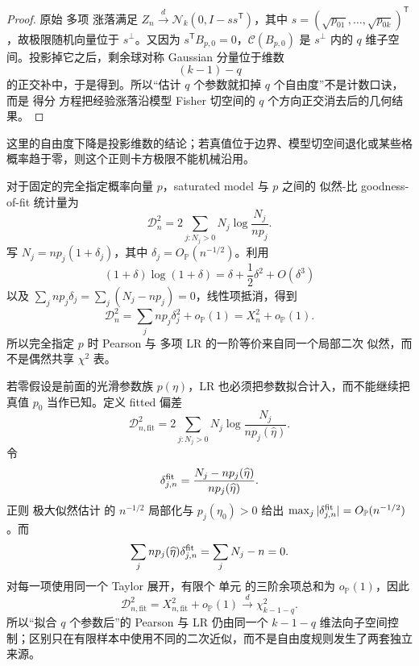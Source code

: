 \begin{proof}
原始 多项 涨落满足 $Z_n\xrightarrow{d}\mathcal N_k(0,I-ss^{\mathsf T})$，其中 $s=(\sqrt{p_{01}},\ldots,\sqrt{p_{0k}})^{\mathsf T}$，故极限随机向量位于 $s^\perp$。又因为 $s^{\mathsf T}B_{p,0}=0$，$\mathcal C(B_{p,0})$ 是 $s^\perp$ 内的 $q$ 维子空间。投影掉它之后，剩余球对称 Gaussian 分量位于维数
\[
 (k-1)-q
\]
的正交补中，于是得到。所以“估计 $q$ 个参数就扣掉 $q$ 个自由度”不是计数口诀，而是 得分 方程把经验涨落沿模型 Fisher 切空间的 $q$ 个方向正交消去后的几何结果。
\end{proof}

这里的自由度下降是投影维数的结论；若真值位于边界、模型切空间退化或某些格概率趋于零，则这个正则卡方极限不能机械沿用。

\begin{proposition}
对于固定的完全指定概率向量 $p$，saturated model 与 $p$ 之间的 似然-比 goodness-of-fit 统计量为
\[
 \mathcal D_n^{2}
 =2\sum_{j:N_j>0}
 N_j\log\frac{N_j}{np_j}.
\]
写 $N_j=np_j(1+\delta_j)$，其中 $\delta_j=O_{\mathbb P}(n^{-1/2})$。利用
\[
 (1+\delta)\log(1+\delta)
 =\delta+\frac12\delta^2+O(\delta^3)
\]
以及 $\sum_jnp_j\delta_j=\sum_j(N_j-np_j)=0$，线性项抵消，得到
\[
 \mathcal D_n^{2}
 =\sum_jnp_j\delta_j^2+o_{\mathbb P}(1)
 =X_n^2+o_{\mathbb P}(1).
\]
所以完全指定 $p$ 时 Pearson 与 多项 LR 的一阶等价来自同一个局部二次 似然，而不是偶然共享 $\chi^2$ 表。

若零假设是前面的光滑参数族 $p(\eta)$，LR 也必须把参数拟合计入，而不能继续把真值 $p_0$ 当作已知。定义 fitted 偏差
\begin{equation*}\mathcal D_{n,\mathrm{fit}}^{2}
 =2\sum_{j:N_j>0}
 N_j\log\frac{N_j}{n p_j(\widehat\eta)}.
\end{equation*}
令
\[
 \delta_{j,n}^{\rm fit}
 =\frac{N_j-np_j(\widehat\eta)}{np_j(\widehat\eta)}.
\]
正则 极大似然估计 的 $n^{-1/2}$ 局部化与 $p_j(\eta_0)>0$ 给出 $\max_j|\delta_{j,n}^{\rm fit}|=O_{\mathbb P}(n^{-1/2})$。而
\[
 \sum_jnp_j(\widehat\eta)\delta_{j,n}^{\rm fit}
 =\sum_jN_j-n=0.
\]
对每一项使用同一个 Taylor 展开，有限个 单元 的三阶余项总和为 $o_{\mathbb P}(1)$，因此
\begin{equation*}\mathcal D_{n,\mathrm{fit}}^{2}
 =X_{n,\mathrm{fit}}^2+o_{\mathbb P}(1)
 \xrightarrow{d}\chi^2_{k-1-q}.
\end{equation*}
所以“拟合 $q$ 个参数后”的 Pearson 与 LR 仍由同一个 $k-1-q$ 维法向子空间控制；区别只在有限样本中使用不同的二次近似，而不是自由度规则发生了两套独立来源。
\end{proposition}

